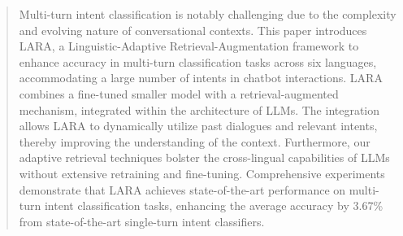 \begin{abstract}

Multi-turn intent classification is notably challenging due to the complexity and evolving nature of conversational contexts. This paper introduces LARA, a Linguistic-Adaptive Retrieval-Augmentation framework to enhance accuracy in multi-turn classification tasks across six languages, accommodating a large number of intents in chatbot interactions. LARA combines a fine-tuned smaller model with a retrieval-augmented mechanism, integrated within the architecture of LLMs. The integration allows LARA to dynamically utilize past dialogues and relevant intents, thereby improving the understanding of the context. Furthermore, our adaptive retrieval techniques bolster the cross-lingual capabilities of LLMs without extensive retraining and fine-tuning. Comprehensive experiments demonstrate that LARA achieves state-of-the-art performance on multi-turn intent classification tasks, enhancing the average accuracy by 3.67\% from state-of-the-art single-turn intent classifiers.


\end{abstract}